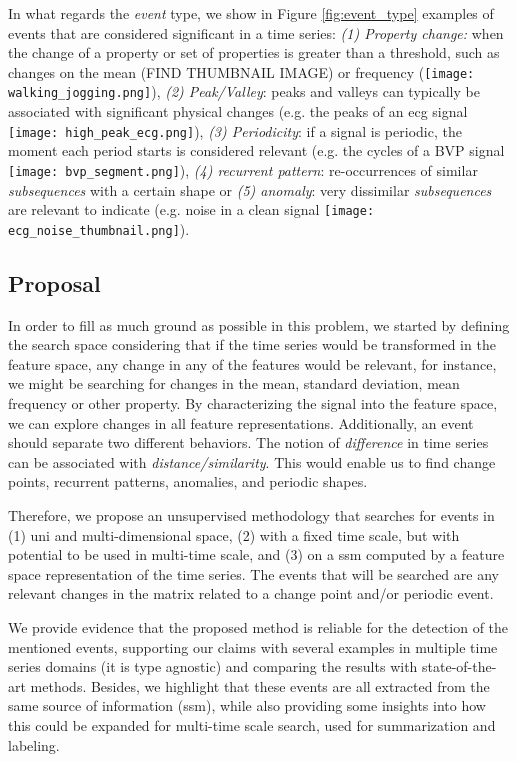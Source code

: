 In what regards the \textit{event} type, we show in Figure \ref{fig:event_type} examples of events that are considered significant in a time series: \textit{(1) Property change:} when the change of a property or set of properties is greater than a threshold, such as changes on the mean (FIND THUMBNAIL IMAGE) or frequency (\texttt{[image: walking\_jogging.png]}), \textit{(2) Peak/Valley}: peaks and valleys can typically be associated with significant physical changes (e.g. the peaks of an \gls{ecg} signal \texttt{[image: high\_peak\_ecg.png]}), \textit{(3) Periodicity}: if a signal is periodic, the moment each period starts is considered relevant (e.g. the cycles of a BVP signal \texttt{[image: bvp\_segment.png]}), \textit{(4) recurrent pattern}: re-occurrences of similar \textit{subsequences} with a certain shape or \textit{(5) anomaly}: very dissimilar \textit{subsequences} are relevant to indicate (e.g. noise in a clean signal \texttt{[image: ecg\_noise\_thumbnail.png]}).

\subsection{Proposal}

In order to fill as much ground as possible in this problem, we started by defining the search space considering that if the time series would be transformed in the feature space, any change in any of the features would be relevant, for instance, we might be searching for changes in the mean, standard deviation, mean frequency or other property. By characterizing the signal into the feature space, we can explore changes in all feature representations. Additionally, an event should separate two different behaviors. The notion of \textit{difference} in time series can be associated with \textit{distance/similarity}. This would enable us to find change points, recurrent patterns, anomalies, and periodic shapes. 
\par
Therefore, we propose an unsupervised methodology that searches for events in (1) uni and multi-dimensional space, (2) with a fixed time scale, but with potential to be used in multi-time scale, and (3) on a \gls{ssm} computed by a feature space representation of the time series. The events that will be searched are any relevant changes in the matrix related to a change point and/or periodic event.
\par
We provide evidence that the proposed method is reliable for the detection of the mentioned events, supporting our claims with several examples in multiple time series domains (it is type agnostic) and comparing the results with state-of-the-art methods. Besides, we highlight that these events are all extracted from the same source of information (\gls{ssm}), while also providing some insights into how this could be expanded for multi-time scale search, used for summarization and labeling.
    
